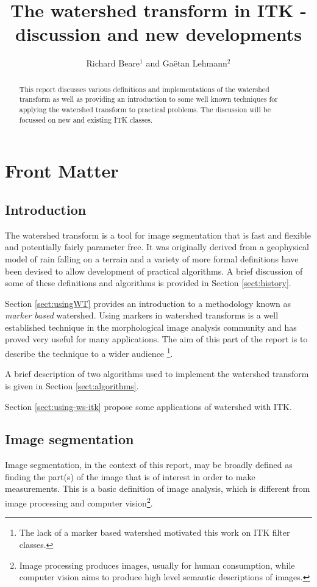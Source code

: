 \documentclass{InsightArticle}
\title{The watershed transform in ITK - discussion and new developments}
\author{Richard Beare{$^1$} {\small{and}} Ga\"etan Lehmann{$^2$}}
\begin{document}
\maketitle

\ifhtml
\chapter*{Front Matter\label{front}}
\fi


\begin{abstract}
\noindent
This report discusses various definitions and implementations of the
watershed transform as well as providing an introduction to some well
known techniques for applying the watershed transform to practical
problems. The discussion will be focussed on new and existing ITK
classes.
\end{abstract}

\tableofcontents
\section{Introduction}

The watershed transform is a tool for image segmentation that is fast
and flexible and potentially fairly parameter free. It was originally
derived from a geophysical model of rain falling on a terrain and a variety
of more formal definitions have been devised to allow development of
practical algorithms. A brief discussion of some of these definitions
and algorithms is provided in Section \ref{sect:history}. 

Section \ref{sect:usingWT} provides an introduction to a methodology
known as {\em marker based} watershed. Using markers in watershed
transforms is a well established technique in the morphological image
analysis community and has proved very useful for many
applications. The aim of this part of the report is to describe the
technique to a wider audience \footnote{The lack of a marker based
watershed motivated this work on ITK filter classes.}.

A brief description of two algorithms used to implement the watershed
transform is given in Section \ref{sect:algorithms}.

Section \ref{sect:using-ws-itk} propose some applications of watershed
with ITK.

\section{Image segmentation}
Image segmentation, in the context of this report, may be broadly
defined as finding the part(s) of the image that is of interest in
order to make measurements. This is a basic definition of image
analysis, which is different from image processing and computer
vision\footnote{Image processing produces images, usually for human
consumption, while computer vision aims to produce high level semantic
descriptions of images.}.
\end{document}
